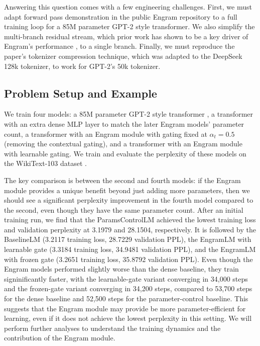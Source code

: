 \documentclass[11pt]{article}
\begin{document}
Answering this question comes with a few engineering challenges. First, we must adapt forward pass demonstration in the public Engram repository to a full training loop for a 85M parameter GPT-2 style transformer. We also 
simplify the multi-branch residual stream, which prior work has shown to be a key driver of Engram's performance \cite{larsson2017fractalnet,szegedy2014goingdeeperconvolutions,xie2026mhcmanifoldconstrainedhyperconnections,zhu2025hyperconnections}, to a single branch. Finally,
we must reproduce the paper's tokenizer compression technique, which was adapted to the DeepSeek 128k tokenizer, to work for GPT-2's 50k tokenizer.

\subsection{Problem Setup and Example}

We train four models: a 85M parameter GPT-2 style transformer \cite{radford2019language}, a transformer with an extra dense MLP layer to match the later Engram models' parameter count,
a transformer with an Engram module with gating fixed at $\alpha_t = 0.5$ (removing the contextual gating), and a transformer with an Engram module with learnable gating. 
We train and evaluate the perplexity of these models on the WikiText-103 dataset \cite{merity2016pointer}.

The key comparison is between the second and fourth models: if the Engram module provides a unique benefit beyond just adding more parameters, then we should see a significant perplexity improvement in the fourth model compared to the second, even though they have the same parameter count.
After an initial training run, we find that the ParamsControlLM achieved the lowest training loss and validation perplexity at 3.1979 and 28.1504, respectively.
It is followed by the BaselineLM (3.2117 training loss, 28.7229 validation PPL), the EngramLM with learnable gate (3.3184 training loss, 34.9481 validation PPL), and the EngramLM with frozen gate (3.2651 training loss, 35.8792 validation PPL).
Even though the Engram models performed slightly worse than the dense baseline, they train signinificantly faster, with the learnable-gate variant converging in 34{,}000 steps and the frozen-gate variant converging in 34{,}200 steps, compared to 53{,}700 steps for the dense baseline and 52{,}500 steps for the parameter-control baseline.
This suggests that the Engram module may provide be more parameter-efficient for learning, even if it does not achieve the lowest perplexity in this setting. We will perform further analyses to understand the training dynamics and the contribution of the Engram module.
\end{document}
